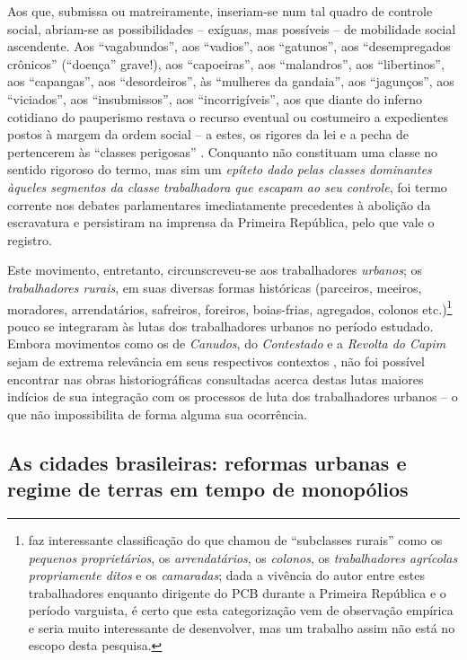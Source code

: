 Aos que, submissa ou matreiramente, inseriam-se num tal quadro de controle social, abriam-se as possibilidades -- exíguas, mas possíveis -- de mobilidade social ascendente. Aos ``vagabundos'', aos ``vadios'', aos ``gatunos'', aos ``desempregados crônicos'' (``doença'' grave!), aos ``capoeiras'', aos ``malandros'', aos ``libertinos'', aos ``capangas'', aos ``desordeiros'', às ``mulheres da gandaia'', aos ``jagunços'', aos ``viciados'', aos ``insubmissos'', aos ``incorrigíveis'', aos que diante do inferno cotidiano do pauperismo restava o recurso eventual ou costumeiro a expedientes postos à margem da ordem social  -- a estes, os rigores da lei e a pecha de pertencerem às ``classes perigosas'' \cite{chalhoub_botequim_1986, guimaraes_classper_1981}. Conquanto não constituam uma classe no sentido rigoroso do termo, mas sim um \textit{epíteto dado pelas classes dominantes àqueles segmentos da classe trabalhadora que escapam ao seu controle}, foi termo corrente nos debates parlamentares imediatamente precedentes à abolição da escravatura e persistiram na imprensa da Primeira República, pelo que vale o registro. 

Este movimento, entretanto, circunscreveu-se aos trabalhadores \textit{urbanos}; os \textit{trabalhadores rurais}, em suas diversas formas históricas (parceiros, meeiros, moradores, arrendatários, safreiros, foreiros, boias-frias, agregados, colonos etc.)\footnote{ faz interessante classificação do que chamou de ``subclasses rurais'' como os \textit{pequenos proprietários}, os \textit{arrendatários}, os \textit{colonos}, os \textit{trabalhadores agrícolas propriamente ditos} e os \textit{camaradas}; dada a vivência do autor entre estes trabalhadores enquanto dirigente do PCB durante a Primeira República e o período varguista, é certo que esta categorização vem de observação empírica e seria muito interessante de desenvolver, mas um trabalho assim não está no escopo desta pesquisa.} pouco se integraram às lutas dos trabalhadores urbanos no período estudado. Embora movimentos como os de \textit{Canudos}, do \textit{Contestado} e a \textit{Revolta do Capim} sejam de extrema relevância em seus respectivos contextos \cite{mottazarth_rescamp1_2008}, não foi possível encontrar nas obras historiográficas consultadas acerca destas lutas maiores indícios de sua integração com os processos de luta dos trabalhadores urbanos -- o que não impossibilita de forma alguma sua ocorrência.

\subsection{As cidades brasileiras: reformas urbanas e regime de terras em tempo de monopólios}\label{subsec:cidbraref}

